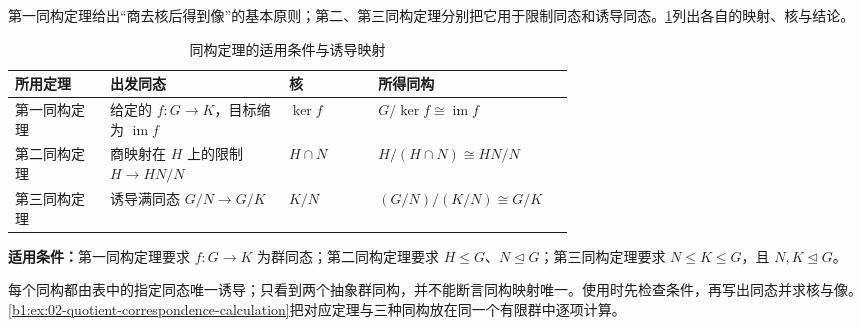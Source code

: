 第一同构定理给出“商去核后得到像”的基本原则；第二、第三同构定理分别把它用于限制同态和诱导同态。\cref{b1:tab:isomorphism-comparison}列出各自的映射、核与结论。
\begin{table}[htbp]
	\centering
	\small \caption{同构定理的适用条件与诱导映射}\label{b1:tab:isomorphism-comparison}
	\begin{tabularx}{\linewidth}{@{}p{0.17\linewidth}p{0.32\linewidth}p{0.16\linewidth}X@{}}
		\toprule
		所用定理 & 出发同态 & 核 & 所得同构 \\
		\midrule
		第一同构定理 & 给定的 \(f:G\to K\)，目标缩为 \(\operatorname{im}f\) & \(\ker f\) & \(G/\ker f\cong\operatorname{im}f\) \\
		第二同构定理 & 商映射在 \(H\) 上的限制 \(H\to HN/N\) & \(H\cap N\) & \(H/(H\cap N)\cong HN/N\) \\
		第三同构定理 & 诱导满同态 \(G/N\to G/K\) & \(K/N\) & \((G/N)/(K/N)\cong G/K\) \\
		\bottomrule
	\end{tabularx}
	\par\smallskip
	\raggedright\textbf{适用条件：}第一同构定理要求 \(f:G\rightarrow K\) 为群同态；第二同构定理要求 \(H\leq G\)、\(N\trianglelefteq G\)；第三同构定理要求 \(N\leq K\leq G\)，且 \(N,K\trianglelefteq G\)。
\end{table}

每个同构都由表中的指定同态唯一诱导；只看到两个抽象群同构，并不能断言同构映射唯一。使用时先检查条件，再写出同态并求核与像。\cref{b1:ex:02-quotient-correspondence-calculation}把对应定理与三种同构放在同一个有限群中逐项计算。
